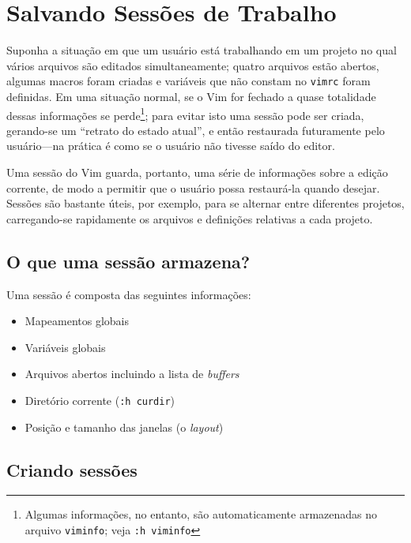 
\chapter{Salvando Sessões de Trabalho}
\label{cha:Salvando Sessões de Trabalho}

Suponha a situação em que um usuário está trabalhando em um projeto no qual
vários arquivos são editados simultaneamente; quatro arquivos estão abertos,
algumas macros foram criadas e variáveis que não constam no \verb|vimrc| foram
definidas. Em uma situação normal, se o Vim for fechado a quase totalidade
dessas informações se perde\footnote{Algumas informações, no entanto, são
automaticamente armazenadas no arquivo {\tt viminfo}; veja {\tt :h viminfo} }; 
para evitar isto uma sessão pode ser criada, gerando-se um
``retrato do estado atual'', e então restaurada futuramente pelo
usuário---na prática é como se o usuário não tivesse saído do editor. 

Uma sessão do Vim guarda, portanto, uma série de informações sobre a edição
corrente, de modo a permitir que o usuário possa restaurá-la quando desejar.
Sessões são bastante úteis, por exemplo, para se alternar entre diferentes
projetos, carregando-se rapidamente os arquivos e definições relativas a cada
projeto.

\section{O que uma sessão armazena?}

Uma sessão é composta das seguintes informações:

\begin{itemize}
 \item Mapeamentos globais
 \item Variáveis globais
 \item Arquivos abertos incluindo a lista de {\it buffers}
 \item Diretório corrente ({\tt :h curdir})
 \item Posição e tamanho das janelas (o {\em layout}) 
\end{itemize}

\section{Criando sessões}
\label{sec:Criando sessões}

